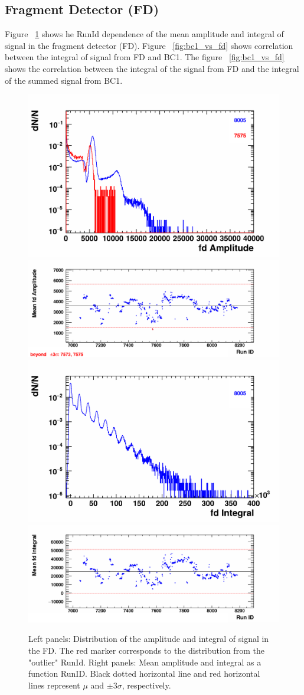 \subsection{Fragment Detector (FD)}

    Figure ~\ref{fig:FD} shows he RunId dependence of the mean amplitude and integral of signal in the fragment detector (FD). Figure ~\ref{fig:bc1_vs_fd} shows correlation between the integral of signal from FD and BC1. The figure ~\ref{fig:bc1_vs_fd} shows the correlation between the integral of the signal from FD and the integral of the summed signal from BC1.

    \begin{figure}[H]
        \begin{center}
            \includegraphics[width=0.35\linewidth]{../pict/QA_RunByRun_24.12/H1/nVtxTr_h2_RunId_fdAmp.png}
            \includegraphics[width=0.60\linewidth]{../pict/QA_RunByRun_24.12/nVtxTr_h2_RunId_fdAmp.png}
            \includegraphics[width=0.35\linewidth]{../pict/QA_RunByRun_24.12/H1/nVtxTr_h2_RunId_fdInt.png}
            \includegraphics[width=0.60\linewidth]{../pict/QA_RunByRun_24.12/nVtxTr_h2_RunId_fdInt.png}
            \vspace{-3mm}
            \caption{Left panels: Distribution of the amplitude and integral of signal in the FD. The red marker corresponds to the distribution from the "outlier" RunId. Right panels: Mean amplitude and integral as a function RunID. Black dotted horizontal line and red horizontal lines represent $\mu$ and $\pm3\sigma$, respectively.}
            \label{fig:FD}
        \end{center}
        \vspace{-5mm}
    \end{figure}

